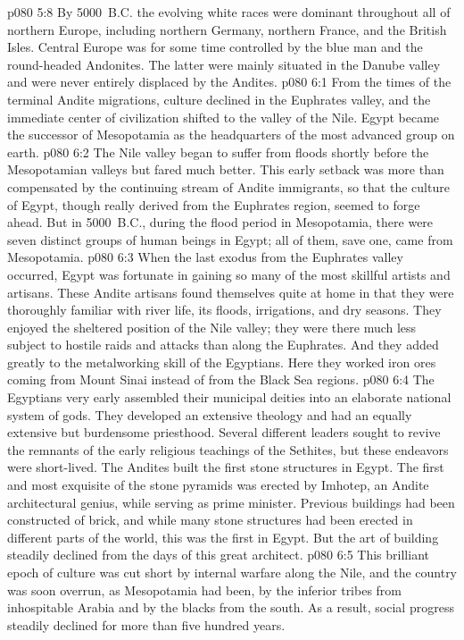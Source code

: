 \pc \vs p080 5:8 By 5000~B.C. the evolving white races were dominant throughout all of northern Europe, including northern Germany, northern France, and the British Isles. Central Europe was for some time controlled by the blue man and the round\hyp{}headed Andonites. The latter were mainly situated in the Danube valley and were never entirely displaced by the Andites.
\vs p080 6:1 From the times of the terminal Andite migrations, culture declined in the Euphrates valley, and the immediate center of civilization shifted to the valley of the Nile. Egypt became the successor of Mesopotamia as the headquarters of the most advanced group on earth.
\vs p080 6:2 The Nile valley began to suffer from floods shortly before the Mesopotamian valleys but fared much better. This early setback was more than compensated by the continuing stream of Andite immigrants, so that the culture of Egypt, though really derived from the Euphrates region, seemed to forge ahead. But in 5000~B.C., during the flood period in Mesopotamia, there were seven distinct groups of human beings in Egypt; all of them, save one, came from Mesopotamia.
\pc \vs p080 6:3 When the last exodus from the Euphrates valley occurred, Egypt was fortunate in gaining so many of the most skillful artists and artisans. These Andite artisans found themselves quite at home in that they were thoroughly familiar with river life, its floods, irrigations, and dry seasons. They enjoyed the sheltered position of the Nile valley; they were there much less subject to hostile raids and attacks than along the Euphrates. And they added greatly to the metalworking skill of the Egyptians. Here they worked iron ores coming from Mount Sinai instead of from the Black Sea regions.
\pc \vs p080 6:4 The Egyptians very early assembled their municipal deities into an elaborate national system of gods. They developed an extensive theology and had an equally extensive but burdensome priesthood. Several different leaders sought to revive the remnants of the early religious teachings of the Sethites, but these endeavors were short\hyp{}lived. The Andites built the first stone structures in Egypt. The first and most exquisite of the stone pyramids was erected by Imhotep, an Andite architectural genius, while serving as prime minister. Previous buildings had been constructed of brick, and while many stone structures had been erected in different parts of the world, this was the first in Egypt. But the art of building steadily declined from the days of this great architect.
\vs p080 6:5 This brilliant epoch of culture was cut short by internal warfare along the Nile, and the country was soon overrun, as Mesopotamia had been, by the inferior tribes from inhospitable Arabia and by the blacks from the south. As a result, social progress steadily declined for more than five hundred years.
